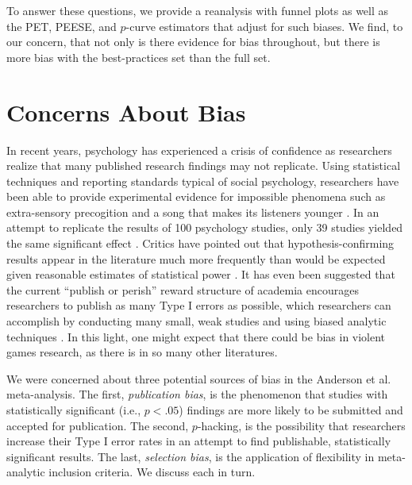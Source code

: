 \documentclass[man]{apa6}
\begin{document}
To answer these questions, we provide a reanalysis with funnel plots as well as the PET, PEESE, and $p$-curve estimators that adjust for such biases.  We find, to our concern, that not only is there evidence for bias throughout, but there is more bias with the best-practices set than the full set.  

\section{Concerns About Bias}
In recent years, psychology has experienced a crisis of confidence as researchers realize that many published research findings may not replicate. Using statistical techniques and reporting standards typical of social psychology, researchers have been able to provide experimental evidence for impossible phenomena such as extra-sensory precogition \citep{Bem:2011} and a song that makes its listeners younger \citep{Simmons:etal:2011}. In an attempt to replicate the results of 100 psychology studies, only 39 studies yielded the same significant effect \citep{OpenScienceCollaboration:2015}. Critics have pointed out that hypothesis-confirming results appear in the literature much more frequently than would be expected given reasonable estimates of statistical power \citep[see][]{Schimmack:2012}. %
It has even been suggested that the current ``publish or perish'' reward structure of academia encourages researchers to publish as many Type I errors as possible, which researchers can accomplish by conducting many small, weak studies and using biased analytic techniques \citep{Bakker:etal:2012}. In this light, one might expect that there could be bias in violent games research, as there is in so many other literatures. 

We were concerned about three potential sources of bias in the Anderson et al. meta-analysis. The first, {\em publication bias}, is the phenomenon that studies with statistically significant (i.e., $p<.05$) findings are more likely to be submitted and accepted for publication. The second, $p$-hacking, is the possibility that researchers increase their Type I error rates in an attempt to find publishable, statistically significant results. The last, {\em selection bias}, is the application of flexibility in meta-analytic inclusion criteria. We discuss each in turn.
\end{document}
